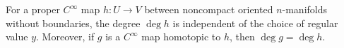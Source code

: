 For a proper $C^{\infty}$ map $h \colon U \to V$ between noncompact oriented $n$-manifolds without boundaries, the degree $\deg h$ is independent of the choice of regular value $y$. Moreover, if $g$ is a $C^{\infty}$ map homotopic to $h$, then $\deg g = \deg h$.

